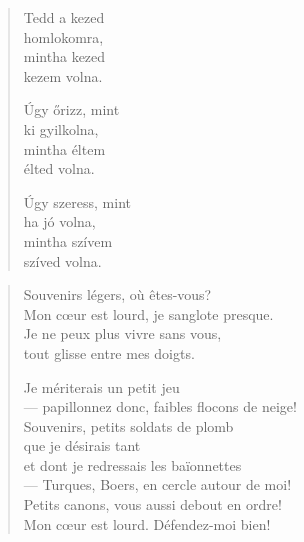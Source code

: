 \documentclass[11pt]{book}
\newcommand*{\centeredornament}{\centerline{\pgfornament[width=6cm]{88}}}
\begin{document}


\begin{verse}
  Tedd a kezed \\
  homlokomra, \\
  mintha kezed \\
  kezem volna.

  Úgy őrizz, mint \\
  ki gyilkolna, \\
  mintha éltem \\
  élted volna.

  Úgy szeress, mint \\
  ha jó volna, \\
  mintha szívem \\
  szíved volna.
\end{verse}

\newpage

\vspace*{-15mm}
\centeredornament




\begin{verse}
  Souvenirs légers, où êtes-vous? \\
  Mon cœur est lourd, je sanglote presque. \\
  Je ne peux plus vivre sans vous, \\
  tout glisse entre mes doigts.

  Je mériterais un petit jeu \\
  --- papillonnez donc, faibles flocons de neige! \\
  Souvenirs, petits soldats de plomb \\
  que je désirais tant \\
  et dont je redressais les baïonnettes \\
  --- Turques, Boers, en cercle autour de moi! \\
  Petits canons, vous aussi debout en ordre! \\
  Mon cœur est lourd. Défendez-moi bien!
\end{verse}

\newpage

\vspace*{-15mm}
\centeredornament
\end{document}
